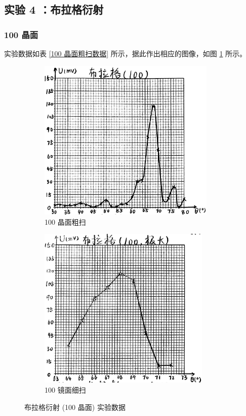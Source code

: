 \documentclass[UTF8]{article}
\theoremstyle{MyLineTheoremStyle} %
\theoremstyle{MyBlockTheoremStyle} %
\theoremstyle{MySubsubsectionStyle} %
\begin{document}
\subsection{实验 4 ：布拉格衍射}
\subsubsection{ 100 晶面}
实验数据如表 \ref{100 晶面粗扫数据} 所示，据此作出相应的图像，如图 \ref{100} 所示。

\begin{figure}[H]\centering
\begin{subfigure}[b]{0.5\columnwidth}\centering
    \includegraphics[height=220pt]{assets/4 布拉格/布 100.png}
    \caption{100 晶面粗扫}
\end{subfigure}\hfill
\begin{subfigure}[b]{0.5\columnwidth}\centering
    \includegraphics[height=220pt]{assets/4 布拉格/布 100大.png}
    \caption{100 镜面细扫}
\end{subfigure}
\caption{布拉格衍射 (100 晶面) 实验数据}
\label{100}
\end{figure}
\end{document}
